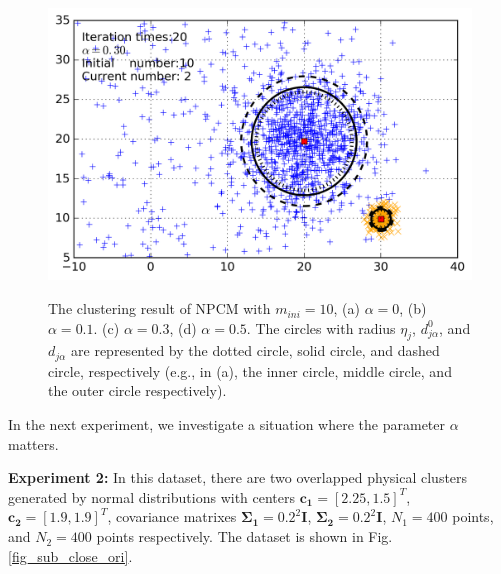 \documentclass[conference]{IEEEtran}
\theoremstyle{definition}
\begin{document}
\begin{figure}[tb]
    {\includegraphics[width=\columnwidth]{img/small_cluster_structure_preserve_last_frame_n_10_alpha_0_3.png}\label{fig_sub_small_0_3}}
   \quad
\caption{The clustering result of NPCM with $m_{ini}=10$, (a) $\alpha=0$, (b) $\alpha=0.1.$ (c) $\alpha=0.3$, (d) $\alpha=0.5$.
The circles with radius $\eta_j$, $d_{j\alpha}^0$, and $d_{j\alpha}$ are represented by the dotted circle, solid circle, and dashed circle, respectively (e.g., in (a), the inner circle, middle circle, and the outer circle respectively).}
\label{fig_small_cluster}
\end{figure}

In the next experiment, we investigate a situation where the parameter $\alpha$ matters.

\textbf{Experiment 2:} In this dataset, there are two overlapped physical clusters generated by normal distributions with centers $\mathbf{c_1}=[2.25, 1.5]^T$, $\mathbf{c_2}=[1.9, 1.9]^T$, covariance matrixes $\mathbf{\Sigma_1}=0.2^2\mathbf{I}$, $\mathbf{\Sigma_2}=0.2^2\mathbf{I}$, $N_1=400$ points, and $N_2=400$ points  respectively. The dataset is shown in Fig.\ref{fig_sub_close_ori}.
\end{document}
